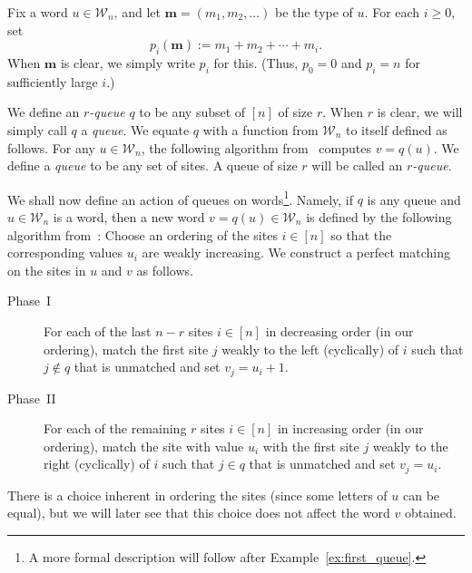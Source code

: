 \documentclass[reqno]{amsart}
\newcommand{\0}{\phantom{c}}
\newcommand{\mm}{\mathbf{m}}
\newcommand{\mcW}{\mathcal{W}}
\newenvironment{verlong}{}{}
\newenvironment{vershort}{}{}
\newcommand{\ive}[1]{\left[ #1 \right]}
\newcommand{\defn}[1]{{\color{darkred}\emph{#1}}} %
\theoremstyle{plain}
\theoremstyle{definition}
\numberwithin{equation}{section}
\begin{document}
Fix a word $u \in \mcW_n$, and let $\mm = (m_1, m_2, \ldots)$ be the type of $u$.
For each $i \geq 0$, set
\begin{equation}
\label{eq:type_partial_sums}
p_i(\mm) := m_1 + m_2 + \cdots + m_i.
\end{equation}
When $\mm$ is clear, we simply write $p_i$ for this.
(Thus, $p_0 = 0$ and $p_i = n$ for sufficiently large $i$.)

\begin{vershort}
We define an \defn{$r$-queue} $q$ to be any subset of $\ive{n}$ of size $r$. When $r$ is clear, we will simply call $q$ a \defn{queue}.
We equate $q$ with a function from $\mcW_n$ to itself defined as follows.
For any $u \in \mcW_n$, the following algorithm from~\cite[Sec.~4.5]{AAMP} computes $v = q(u)$.
\end{vershort}
\begin{verlong}
We define a \defn{queue} to be any set of sites.
A queue of size $r$ will be called an \defn{$r$-queue}.

We shall now define an action of queues on words\footnote{%
A more formal description will follow after
Example~\ref{ex:first_queue}.}.
Namely, if $q$ is any queue and $u \in \mcW_n$ is a word,
then a new word $v = q(u) \in \mcW_n$ is defined by the following algorithm from~\cite[Sec.~4.5]{AAMP}:
\end{verlong}
Choose an ordering of the sites $i \in \ive{n}$ so that the corresponding values $u_i$ are weakly increasing.
We construct a perfect matching on the sites in $u$ and $v$ as follows.
\begin{description}
\item[Phase~I]
   For each of the last $n - r$ sites $i \in \ive{n}$ in decreasing order (in our ordering), match the first site $j$ weakly to the left (cyclically) of $i$ such that $j \notin q$ that is unmatched and set $v_j = u_i + 1$.
\item[Phase~II]
   For each of the remaining $r$ sites $i \in \ive{n}$ in increasing order (in our ordering), match the site with value $u_i$ with the first site $j$ weakly to the right (cyclically) of $i$ such that $j \in q$ that is unmatched and set $v_j = u_i$.
\end{description}
There is a choice inherent in ordering the sites (since some letters of $u$ can be equal), but we will later see that this choice does not affect the word $v$ obtained.
\end{document}
